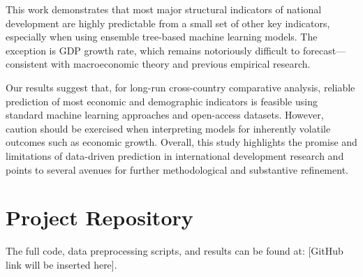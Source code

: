 \documentclass[12pt]{article}
\begin{document}
This work demonstrates that most major structural indicators of national development are highly predictable from a small set of other key indicators, especially when using ensemble tree-based machine learning models. The exception is GDP growth rate, which remains notoriously difficult to forecast—consistent with macroeconomic theory and previous empirical research.

Our results suggest that, for long-run cross-country comparative analysis, reliable prediction of most economic and demographic indicators is feasible using standard machine learning approaches and open-access datasets. However, caution should be exercised when interpreting models for inherently volatile outcomes such as economic growth. Overall, this study highlights the promise and limitations of data-driven prediction in international development research and points to several avenues for further methodological and substantive refinement.


\section*{Project Repository}
The full code, data preprocessing scripts, and results can be found at: [GitHub link will be inserted here].





\end{document}
